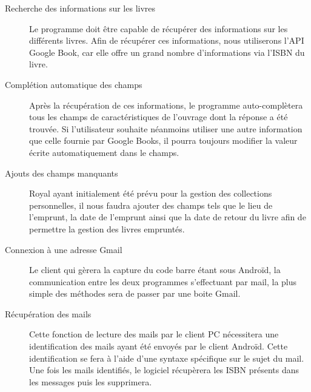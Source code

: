 \begin{description}
\item[Recherche des informations sur les livres]
	Le programme doit être capable de récupérer des informations sur les différents livres.
	Afin de récupérer ces informations, nous utiliserons l'API Google Book, car elle offre un grand nombre d'informations via l'ISBN du livre.

\item[Complétion automatique des champs]
	Après la récupération de ces informations, le programme auto-complètera tous les champs de caractéristiques de l'ouvrage dont la réponse a été trouvée.
	Si l'utilisateur souhaite néanmoins utiliser une autre information que celle fournie par Google Books, il pourra toujours modifier la valeur écrite automatiquement dans le champs.

\item[Ajouts des champs manquants]
	Royal ayant initialement été prévu pour la gestion des collections personnelles, il nous faudra ajouter des champs tels que le lieu de l'emprunt, la date de l'emprunt ainsi que la date de retour du livre afin de permettre la gestion des livres empruntés. 

\item[Connexion à une adresse Gmail]
	Le client qui gèrera la capture du code barre étant sous Androïd, la communication entre les deux programmes s'effectuant par mail, la plus simple des méthodes sera de passer par une boite Gmail.

\item[Récupération des mails]
	Cette fonction de lecture des mails par le client PC nécessitera une identification des mails ayant été envoyés par le client Androïd. 
	Cette identification se fera à l'aide d'une syntaxe spécifique sur le sujet du mail. Une fois les mails identifiés, le logiciel récupèrera les ISBN présents dans les messages puis les supprimera.  

\end{description}
